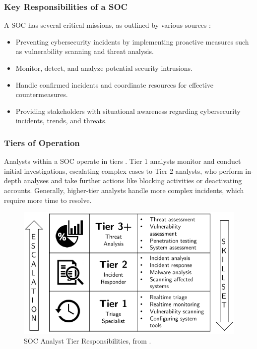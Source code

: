 \subsubsection{Key Responsibilities of a SOC}
A \gls{SOC} has several critical missions, as outlined by various sources \parencite{Muniz2015, Zimmerman2014}:
\begin{itemize}
    \item Preventing cybersecurity incidents by implementing proactive measures such as vulnerability scanning and threat analysis.
    \item Monitor, detect, and analyze potential security intrusions.
    \item Handle confirmed incidents and coordinate resources for effective countermeasures.
    \item Providing stakeholders with situational awareness regarding cybersecurity incidents, trends, and threats.
\end{itemize}

\subsubsection{Tiers of Operation}
Analysts within a \gls{SOC} operate in tiers \parencite{Vielberth2020}. 
Tier 1 analysts monitor and conduct initial investigations, escalating complex cases to Tier 2 analysts, who perform in-depth analyses and take further actions like blocking activities or deactivating accounts. 
Generally, higher-tier analysts handle more complex incidents, which require more time to resolve.

\begin{figure}[ht]
    \centering
    \includegraphics[width=\textwidth]{ch2/assets/tierTable.png}
    \caption{SOC Analyst Tier Responsibilities, from \autocite{Kokulu2019}.}
    \label{fig:soc-tier}
\end{figure}

